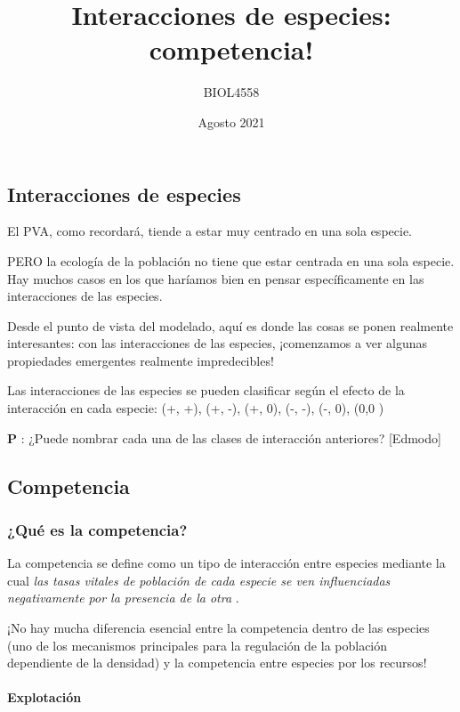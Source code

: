 \documentclass[
]{article}
\title{Interacciones de especies: competencia!}
\author{BIOL4558}
\date{Agosto 2021}
\begin{document}
\maketitle

{
\setcounter{tocdepth}{2}
\tableofcontents
}
\hypertarget{interacciones-de-especies}{%
\subsection{Interacciones de especies}\label{interacciones-de-especies}}

El PVA, como recordará, tiende a estar muy centrado en una sola especie.

PERO la ecología de la población no tiene que estar centrada en una sola
especie. Hay muchos casos en los que haríamos bien en pensar
específicamente en las interacciones de las especies.

Desde el punto de vista del modelado, aquí es donde las cosas se ponen
realmente interesantes: con las interacciones de las especies,
¡comenzamos a ver algunas propiedades emergentes realmente
impredecibles!

Las interacciones de las especies se pueden clasificar según el efecto
de la interacción en cada especie: (+, +), (+, -), (+, 0), (-, -), (-,
0), (0,0 )

\textbf{P }: ¿Puede nombrar cada una de las clases de interacción
anteriores? {[}Edmodo{]}

\hypertarget{competencia}{%
\subsection{Competencia}\label{competencia}}

\hypertarget{quuxe9-es-la-competencia}{%
\subsubsection{¿Qué es la competencia?}\label{quuxe9-es-la-competencia}}

La competencia se define como un tipo de interacción entre especies
mediante la cual \emph{las tasas vitales de población de cada especie se
ven influenciadas negativamente por la presencia de la otra }.

¡No hay mucha diferencia esencial entre la competencia dentro de las
especies (uno de los mecanismos principales para la regulación de la
población dependiente de la densidad) y la competencia entre especies
por los recursos!

\hypertarget{explotaciuxf3n}{%
\paragraph{Explotación}\label{explotaciuxf3n}}
\end{document}
